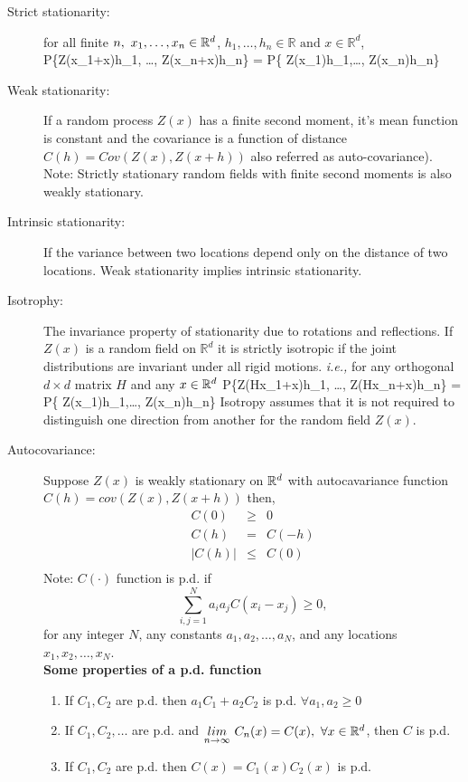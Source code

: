 
%
%
%
%

\begin{description}
\item [Strict stationarity:] for all finite $n,\ x_1,\ldots, x_n \in \mathbb{R}^d$, $h_1, \ldots, h_n\in\mathbb{R} \mbox{ and } x\in \mathbb{R}^d$,
\beq
P\{Z(x_1+x)\le h_1, \ldots, Z(x_n+x)\le h_n\} = P\{ Z(x_1)\le h_1,\ldots, Z(x_n)\le h_n\}
\eeq
  \item [Weak stationarity:] If a random process $Z(x)$ has a finite second moment, it's mean function is constant and the covariance is a function of distance $C(h)=Cov(Z(x),Z(x+h))$ also referred as auto-covariance).\\
Note: Strictly stationary random fields with finite second moments is also weakly stationary.

\item [Intrinsic stationarity:] If the variance between two locations depend only on the distance of two locations. Weak stationarity implies intrinsic stationarity.

\item [Isotrophy:] The invariance property of stationarity due to rotations and reflections. If $Z(x)$ is a random field on $\mathbb{R}^d$ it is strictly isotropic if the joint distributions are invariant under all rigid motions. {\em i.e.,} for any orthogonal $d\times d$ matrix $H$ and any $x\in \mathbb{R}^d$
\beq
P\{Z(Hx_1+x)\le h_1, \ldots, Z(Hx_n+x)\le h_n\} = P\{ Z(x_1)\le h_1,\ldots, Z(x_n)\le h_n\}
\eeq
Isotropy assumes that it is not required to distinguish one direction from another for the random field $Z(x)$.

\item [Autocovariance:] Suppose $Z(x)$ is weakly stationary on $\mathbb{R}^d$ with autocavariance function $C(h) = cov(Z(x), Z(x+h))$ then,
\begin{eqnarray*}
C(0)& \ge & 0 \\
C(h)&=& C(-h)\\
|C(h)|& \le & C(0)\\
\end{eqnarray*}
Note: $C(\cdot)$ function is p.d. if
$$\sum_{i,j=1}^{N} a_i a_j C(x_i - x_j) \ge 0,$$
for any integer $N$, any constants $a_1, a_2, \ldots, a_N$, and any locations $x_1, x_2, \ldots, x_N$. \\

\textbf{Some properties of a p.d. function}
\begin{enumerate}
\item If $C_1, C_2$ are p.d. then $a_1C_1+a_2C_2$ is p.d. $\forall a_1,a_2\ge 0$
\item If $C_1, C_2, \ldots$ are p.d. and $\underset{n\to\infty} {lim}\ C_n(x)=C(x),\ \forall x\in \R^d$, then $C$ is p.d.
\item If $C_1, C_2$ are p.d. then $C(x)=C_1(x)C_2(x)$ is p.d.
\end{enumerate}


\end{description}
